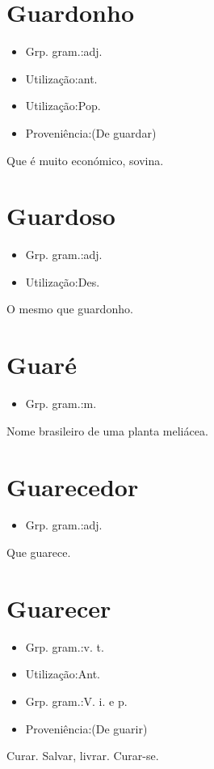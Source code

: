 \section{Guardonho}
\begin{itemize}
\item {Grp. gram.:adj.}
\end{itemize}
\begin{itemize}
\item {Utilização:ant.}
\end{itemize}
\begin{itemize}
\item {Utilização:Pop.}
\end{itemize}
\begin{itemize}
\item {Proveniência:(De \textunderscore guardar\textunderscore )}
\end{itemize}
Que é muito económico, sovina.
\section{Guardoso}
\begin{itemize}
\item {Grp. gram.:adj.}
\end{itemize}
\begin{itemize}
\item {Utilização:Des.}
\end{itemize}
O mesmo que \textunderscore guardonho\textunderscore .
\section{Guaré}
\begin{itemize}
\item {Grp. gram.:m.}
\end{itemize}
Nome brasileiro de uma planta meliácea.
\section{Guarecedor}
\begin{itemize}
\item {Grp. gram.:adj.}
\end{itemize}
Que guarece.
\section{Guarecer}
\begin{itemize}
\item {Grp. gram.:v. t.}
\end{itemize}
\begin{itemize}
\item {Utilização:Ant.}
\end{itemize}
\begin{itemize}
\item {Grp. gram.:V. i.  e  p.}
\end{itemize}
\begin{itemize}
\item {Proveniência:(De \textunderscore guarir\textunderscore )}
\end{itemize}
Curar.
Salvar, livrar.
Curar-se.

